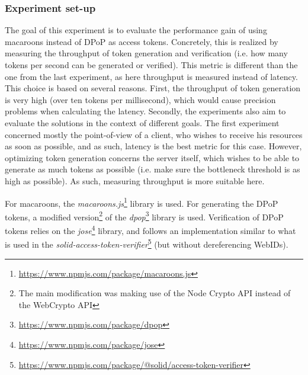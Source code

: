 \subsubsection{Experiment set-up}
The goal of this experiment is to evaluate the performance gain of using macaroons instead of \gls{DPoP} as access tokens. Concretely, this is realized by measuring the throughput of token generation and verification (i.e. how many tokens per second can be generated or verified). This metric is different than the one from the last experiment, as here throughput is measured instead of latency. This choice is based on several reasons. First, the throughput of token generation is very high (over ten tokens per millisecond), which would cause precision problems when calculating the latency. Secondly, the experiments also aim to evaluate the solutions in the context of different goals. The first experiment concerned mostly the point-of-view of a client, who wishes to receive his resources as soon as possible, and as such, latency is the best metric for this case. However, optimizing token generation concerns the server itself, which wishes to be able to generate as much tokens as possible (i.e. make sure the bottleneck threshold is as high as possible). As such, measuring throughput is more suitable here.

For macaroons, the \textit{macaroons.js}\footnote{\url{https://www.npmjs.com/package/macaroons.js}} library is used. For generating the \gls{DPoP} tokens, a modified version\footnote{The main modification was making use of the Node Crypto API instead of the WebCrypto API} of the \textit{dpop}\footnote{\url{https://www.npmjs.com/package/dpop}} library is used. Verification of \gls{DPoP} tokens relies on the \textit{jose}\footnote{\url{https://www.npmjs.com/package/jose}} library, and follows an implementation similar to what is used in the \textit{solid-access-token-verifier}\footnote{\url{https://www.npmjs.com/package/@solid/access-token-verifier}} (but without dereferencing WebIDs).


